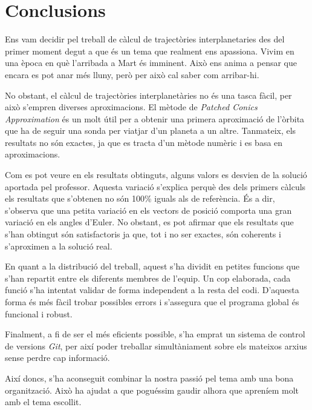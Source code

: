 \chapter{Conclusions}
Ens vam decidir pel treball de càlcul de trajectòries interplanetaries des del primer moment degut a que és un tema que realment ens apassiona. Vivim en una època en què l'arribada a Mart és imminent. Això ens anima a pensar que encara es pot anar més lluny, però per això cal saber com arribar-hi.

No obstant, el càlcul de trajectòries interplanetàries no és una tasca fàcil, per això s'empren diverses aproximacions. El mètode de \textit{Patched Conics Approximation} és un molt útil per a obtenir una primera aproximació de l'òrbita que ha de seguir una sonda per viatjar d'un planeta a un altre. Tanmateix, els resultats no són exactes, ja que es tracta d'un mètode numèric i es basa en aproximacions.

Com es pot veure en els resultats obtinguts, alguns valors es desvien de la solució aportada pel professor. Aquesta variació s'explica perquè des dels primers càlculs els resultats que s'obtenen no són 100\% iguals als de referència. És a dir, s'observa que una petita variació en els vectors de posició comporta una gran variació en els angles d'Euler. No obstant, es pot afirmar que els resultats que s'han obtingut són satisfactoris ja que, tot i no ser exactes, són coherents i s'aproximen a la solució real.

En quant a la distribució del treball, aquest s'ha dividit en petites funcions que s'han repartit entre els diferents membres de l'equip. Un cop elaborada, cada funció s'ha intentat validar de forma independent a la resta del codi. D'aquesta forma és més fàcil trobar possibles errors i s'assegura que el programa global és funcional i robust.

Finalment, a fi de ser el més eficients possible, s'ha emprat un sistema de control de versions \textit{Git}, per així poder treballar simultàniament sobre els mateixos arxius sense perdre cap informació.

Així doncs, s'ha aconseguit combinar la nostra passió pel tema amb una bona organització. Això ha ajudat a que poguéssim gaudir alhora que apreníem molt amb el tema escollit.
